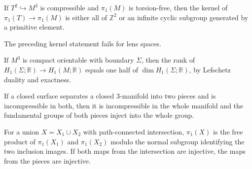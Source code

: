 \begin{lemma}
\label{lem:chow-iv-compressible-torus-kernel}
If \(T^2\hookrightarrow M^3\) is compressible and \(\pi_1(M)\) is torsion-free,
then the kernel of \(\pi_1(T)\to\pi_1(M)\) is either all of \(\mathbb Z^2\) or
an infinite cyclic subgroup generated by a primitive element.
\end{lemma}

\begin{remark}
\label{rem:chow-iv-compressible-torus-lens-space}
The preceding kernel statement fails for lens spaces.
\end{remark}

\begin{lemma}
\label{lem:chow-iv-boundary-h1-rank}
If \(M^3\) is compact orientable with boundary \(\Sigma\), then the rank of
\(H_1(\Sigma;\mathbb R)\to H_1(M;\mathbb R)\) equals one half of
\(\dim H_1(\Sigma;\mathbb R)\), by Lefschetz duality and exactness.
\end{lemma}

\begin{lemma}
\label{lem:chow-iv-separating-incompressible-surfaces}
If a closed surface separates a closed 3-manifold into two pieces and is
incompressible in both, then it is incompressible in the whole manifold and the
fundamental groups of both pieces inject into the whole group.
\end{lemma}

\begin{theorem}
\label{thm:chow-iv-seifert-van-kampen}
For a union \(X=X_1\cup X_2\) with path-connected intersection,
\(\pi_1(X)\) is the free product of \(\pi_1(X_1)\) and \(\pi_1(X_2)\) modulo
the normal subgroup identifying the two inclusion images.  If both maps from
the intersection are injective, the maps from the pieces are injective.
\end{theorem}


